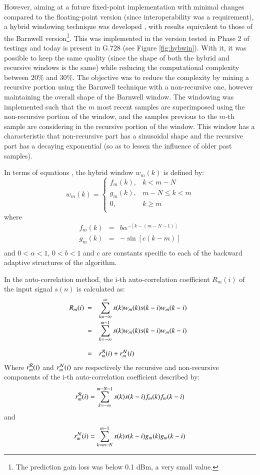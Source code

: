However, aiming at a future fixed-point implementation with minimal
changes compared to the floating-point version (since interoperability
was a requirement), a hybrid windowing technique was developed 
\cite{LD-CELP-FixedPt,G.728}, with results equivalent to those of the
Barnwell version\footnote{\sf The prediction gain loss was below 0.1
  dBm, a very small value.}. This was implemented in the version
tested in Phase 2 of testings and today is present in G.728 (see
Figure \ref{fig:hybwin}). With it, it was possible to keep the same
quality (since the shape of both the hybrid and recursive windows is
the same) while reducing the computational complexity between 20\% and
30\%. The objective was to reduce the complexity by mixing a recursive
portion using the Barnwell technique with a non-recursive one, however
maintaining the overall shape of the Barnwell window.  The windowing
was implemented such that the $m$ most recent samples are superimposed
using the non-recursive portion of the window, and the samples
previous to the $m$-th sample are considering in the recursive portion
of the window. This window has a characteristic that 
non-recursive part has a sinusoidal shape and the recursive part has a
decaying exponential (so as to lessen the influence of older past
samples).

In terms of equations \cite{G.728,LD-CELP-Phase2}, the hybrid window
$w_m(k)$ is defined by:
\[
w_m(k) = \left\{
\begin{array}{ll}
	f_m(k),		&k<m-N\\
	g_m(k), 	&m-N \leq k < m\\
	0,		&k \ge m\\
\end{array} \right.
\]
where
\[
\begin{array}{lll}
	f_m(k) &= & b \alpha^{-[k-(m-N-1)]}\\
	g_m(k) &= & -\sin [c(k-m)]\\
\end{array}
\]
and $0<\alpha<1$, $0<b<1$ and $c$ are constants specific to each of
the backward adaptive structures of the algorithm.

In the auto-correlation method, the i-th auto-correlation coefficient
$R_m(i)$ of the input signal $s(n)$ is calculated as:
\[
R_m(i)
\begin{array}[t]{ll}
	= &\displaystyle\sum_{k=-\infty}^\infty s(k) w_m(k) s(k-i) w_m(k-i)\\
	= &\displaystyle\sum_{k=-\infty}^{m-1} s(k) w_m(k) s(k-i) w_m(k-i)
			\mbox{\ruley{2em}}\\
	= &r_m^{\cal R}(i) + r_m^{\cal N}(i) \mbox{\ruley{2em}}\\
\end{array} 
\]
Where $r_m^{\cal R}(i)$ and $r_m^{\cal N}(i)$ are respectively the
recursive and non-recursive components of the i-th auto-correlation
coefficient described by:
\[
r_m^{\cal R}(i) = \sum_{k=-\infty}^{m-N-1} s(k) s(k-i) f_m(k) f_m(k-i)
\]
and
\[
r_m^{\cal N}(i) = \sum_{k=m-N}^{m-1} s(k) s(k-i) g_m(k) g_m(k-i)
\]

